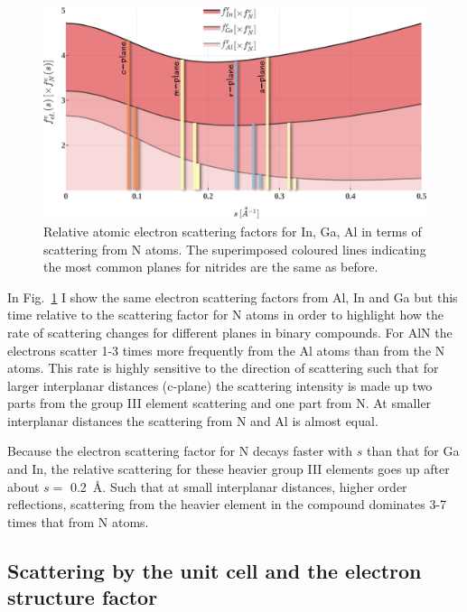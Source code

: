 \begin{figure}
    \centering
\includegraphics[width=1\linewidth]{Figures/scatterFactor_eRel.png}
\caption[Relative atomic electron scattering factors.]{Relative atomic electron scattering factors for In, Ga, Al in terms of scattering from N atoms. The superimposed coloured lines indicating the most common planes for nitrides are the same as before. }
\label{Fig:scatterFactor_eRel}
\end{figure}

In Fig.~\ref{Fig:scatterFactor_eRel} I show the same electron scattering factors from Al, In and Ga but this time relative to the scattering factor for N atoms in order to highlight how the rate of scattering changes for different planes in binary compounds. For AlN the electrons scatter 1-3 times more frequently from the Al atoms than from the N atoms. This rate is highly sensitive to the direction of scattering such that for larger interplanar distances (c-plane) the scattering intensity is made up two parts from the group III element scattering and one part from N. At smaller interplanar distances the scattering from N and Al is almost equal. 


Because the electron scattering factor for N decays faster with $s$ than that for Ga and In, the relative scattering for these heavier group III elements goes up after about $s=$ \SI{0.2}{\angstrom}. Such that at small interplanar distances, \eg higher order reflections, scattering from the heavier element in the compound dominates 3-7 times that from N atoms. 



%
\subsection{Scattering by the unit cell and the electron structure factor}
\label{sec:strucFact}

